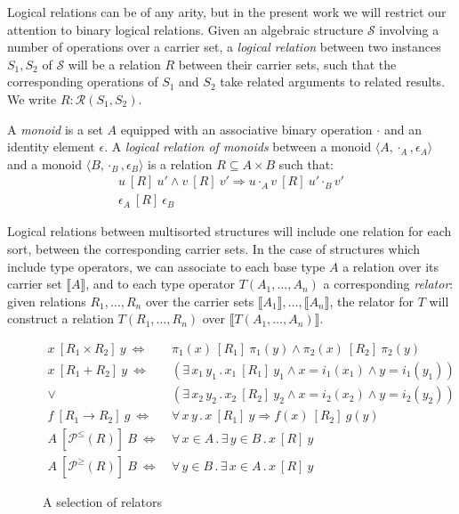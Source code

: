 \documentclass[acmsmall,timestamp,review,anonymous]{acmart}
\newcommand{\ifr}[1]{\ [{#1}]\ }
\begin{document}
Logical relations can be of any arity,
but in the present work
we will restrict our attention to
binary logical relations.
Given an algebraic structure $\mathcal{S}$
involving a number of operations over a carrier set,
a \emph{logical relation}
between two instances $S_1, S_2$ of $\mathcal{S}$
will be a relation $R$
between their carrier sets,
such that the corresponding operations of $S_1$ and $S_2$
take related arguments to related results.
We write $R : \mathcal{R}(S_1, S_2)$.

\begin{example}
\label{ex:monoid}
A \emph{monoid} is a set $A$ equipped with
an associative binary operation $\cdot$ and
an identity element $\epsilon$.
A \emph{logical relation of monoids} between
a monoid $\langle A, \cdot_A, \epsilon_A \rangle$ and
a monoid $\langle B, \cdot_B, \epsilon_B \rangle$
is a relation $R \subseteq A \times B$
such that:
\begin{gather*}
u \ifr{R} u' \wedge v \ifr{R} v' \Rightarrow u \cdot_A v \ifr{R} u' \cdot_B v' \\
\epsilon_A \ifr{R} \epsilon_B
\end{gather*}
\end{example}

Logical relations between multisorted structures
will include one relation for each sort,
between the corresponding carrier sets.
In the case of structures which include type operators,
we can associate to each base type $A$
a relation over its carrier set $\llbracket A \rrbracket$,
and to each type operator $T(A_1, \ldots, A_n)$
a corresponding \emph{relator}:
given relations $R_1, \ldots, R_n$ over
the carrier sets $\llbracket A_1 \rrbracket, \ldots, \llbracket A_n \rrbracket$,
the relator for $T$
will construct a relation $T(R_1, \ldots, R_n)$
over $\llbracket T(A_1, \ldots, A_n) \rrbracket$.

\begin{figure} %
  {\small
  \begin{align*}
    x \ifr{R_1 \times R_2} y \ \Leftrightarrow\  &
      \pi_1(x) \ifr{R_1} \pi_1(y) \wedge
      \pi_2(x) \ifr{R_2} \pi_2(y) \\
    x \ifr{R_1 + R_2} y \ \Leftrightarrow\  &
      (\exists \, x_1 \, y_1 \,.\,
        x_1 \ifr{R_1} y_1 \wedge
        x = i_1(x_1) \wedge
        y = i_1(y_1)) \\ \vee\ &
      (\exists \, x_2 \, y_2 \,.\,
        x_2 \ifr{R_2} y_2 \wedge
        x = i_2(x_2) \wedge
        y = i_2(y_2)) \\
    f \ifr{R_1 \rightarrow R_2} g \ \Leftrightarrow\  &
      \forall \, x \, y \,.\,
        x \ifr{R_1} y \Rightarrow
        f(x) \ifr{R_2} g(y) \\
    A \ifr{\mathcal{P}^\le(R)} B \ \Leftrightarrow\  &
      \forall \, x \in A \,.\,
      \exists \, y \in B \,.\,
      x \ifr{R} y \\
    A \ifr{\mathcal{P}^\ge(R)} B \ \Leftrightarrow\  &
      \forall \, y \in B \,.\,
      \exists \, x \in A \,.\,
      x \ifr{R} y
  \end{align*}
  }%
  \caption{A selection of relators}
  \label{fig:relators}
\end{figure}
\end{document}
